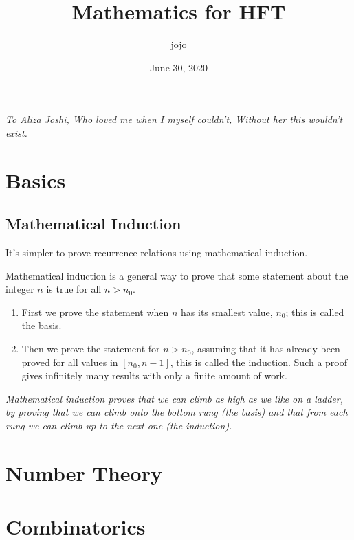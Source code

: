 \documentclass[letterpaper,12pt]{report}
\theoremstyle{definition}
\theoremstyle{remark}
\begin{document}
\title{Mathematics for HFT}
\author{jojo}
\date{June 30, 2020}
\maketitle

\newpage
\vspace*{8cm}
\begin{center}
	\large \emph{
		To Aliza Joshi,\linebreak
		Who loved me when I myself couldn't,\linebreak
		Without her this wouldn't exist.}
\end{center}

\tableofcontents

\part{Basics}
\chapter {Mathematical Induction}
It's simpler to prove recurrence relations using mathematical induction.

Mathematical induction is a general way to prove that some statement about the integer $n$ is true for all $n > n_0$.
\begin{enumerate}
	\item First we prove the statement when $n$ has its smallest value, $n_0$; this is called the basis.
	\item Then we prove the statement for $n > n_0$, assuming that it has already been proved for all values in $ [n_0, n - 1]$, this is called the induction. Such a proof gives infinitely many results with only a finite amount of work.
\end{enumerate}

\textit{Mathematical induction proves that we can climb as high as we like on a ladder, by proving that we can climb onto the bottom rung (the basis) and that from each rung we can climb up to the next one (the induction).}



\part {Number Theory}
\part {Combinatorics}

\end{document}
